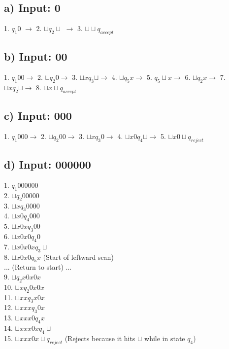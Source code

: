\documentclass[a4paper, UTF-8]{article}
\theoremstyle{plain}
\begin{document}
\subsection{a) Input: 0} 
1. $q_1 0$ $\to$ 2. $\sqcup q_2 \sqcup$ $\to$ 3. $\sqcup \sqcup q_{accept}$

\subsection{b) Input: 00} 
1. $q_1 00 \to$ 2. $\sqcup q_2 0 \to$ 3. $\sqcup x q_3 \sqcup \to$ 4. $\sqcup q_5 x \to$ 5. $q_5 \sqcup x \to$ 6. $\sqcup q_2 x \to$ 7. $\sqcup x q_2 \sqcup \to$ 8. $\sqcup x \sqcup q_{accept}$

\subsection{c) Input: 000} 
1. $q_1 000 \to$ 2. $\sqcup q_2 00 \to$ 3. $\sqcup x q_3 0 \to$ 4. $\sqcup x 0 q_4 \sqcup \to$ 5. $\sqcup x 0 \sqcup q_{reject}$

\subsection{d) Input: 000000} 
1. $q_1 000000$ \\
2. $\sqcup q_2 00000$ \\
3. $\sqcup x q_3 0000$ \\
4. $\sqcup x 0 q_4 000$ \\
5. $\sqcup x 0 x q_3 00$ \\
6. $\sqcup x 0 x 0 q_4 0$ \\
7. $\sqcup x 0 x 0 x q_3 \sqcup$ \\
8. $\sqcup x 0 x 0 q_5 x$ (Start of leftward scan) \\
... (Return to start) ... \\
9. $\sqcup q_2 x 0 x 0 x$ \\
10. $\sqcup x q_2 0 x 0 x$ \\
11. $\sqcup x x q_3 x 0 x$ \\
12. $\sqcup x x x q_3 0 x$ \\
13. $\sqcup x x x 0 q_4 x$ \\
14. $\sqcup x x x 0 x q_4 \sqcup$ \\
15. $\sqcup x x x 0 x \sqcup q_{reject}$ (Rejects because it hits $\sqcup$ while in state $q_4$)
\end{document}
